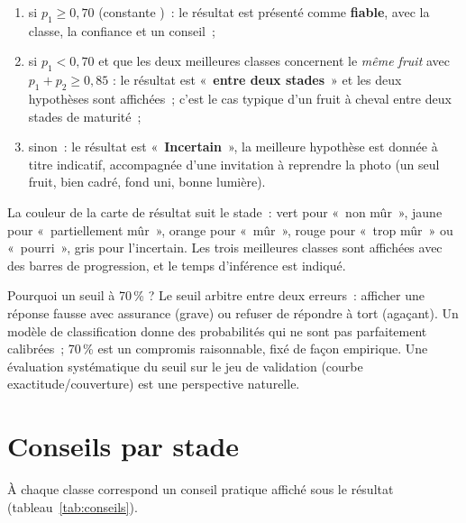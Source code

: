 \begin{enumerate}
  \item si $p_1\ge 0{,}70$ (constante )~: le résultat est présenté comme \textbf{fiable}, avec la classe, la confiance et un conseil~;
  \item si $p_1<0{,}70$ et que les deux meilleures classes concernent le \emph{même fruit} avec $p_1+p_2\ge 0{,}85$ : le résultat est «~\textbf{entre deux stades}~» et les deux hypothèses sont affichées~; c’est le cas typique d’un fruit à cheval entre deux stades de maturité~;
  \item sinon~: le résultat est «~\textbf{Incertain}~», la meilleure hypothèse est donnée à titre indicatif, accompagnée d’une invitation à reprendre la photo (un seul fruit, bien cadré, fond uni, bonne lumière).
\end{enumerate}

La couleur de la carte de résultat suit le stade~: vert pour «~non mûr~», jaune pour «~partiellement mûr~», orange pour «~mûr~», rouge pour «~trop mûr~» ou «~pourri~», gris pour l’incertain. Les trois meilleures classes sont affichées avec des barres de progression, et le temps d’inférence est indiqué.

\begin{keybox}{Pourquoi un seuil à 70\,\% ?}
Le seuil arbitre entre deux erreurs~: afficher une réponse fausse avec assurance (grave) ou refuser de répondre à tort (agaçant). Un modèle de classification donne des probabilités qui ne sont pas parfaitement calibrées~; 70\,\% est un compromis raisonnable, fixé de façon empirique. Une évaluation systématique du seuil sur le jeu de validation (courbe exactitude/couverture) est une perspective naturelle.
\end{keybox}

\section{Conseils par stade}

À chaque classe correspond un conseil pratique affiché sous le résultat (tableau~\ref{tab:conseils}).

